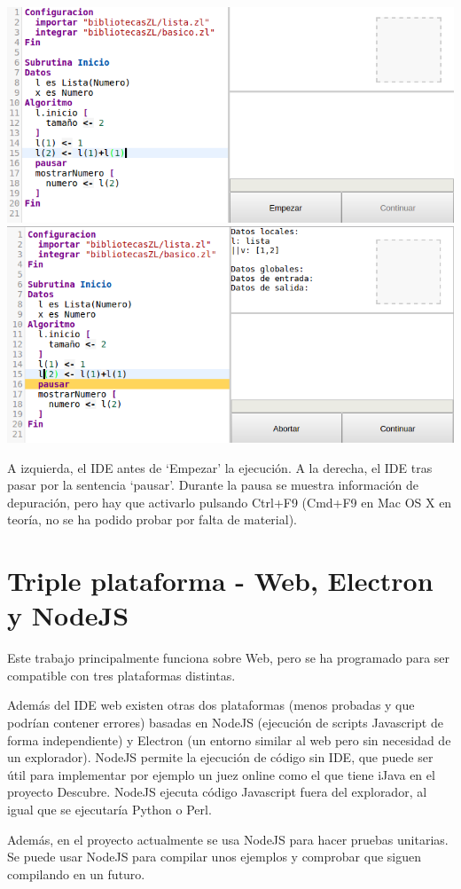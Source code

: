 \documentclass{report}
\begin{document}
	
	\begin{center}
	\includegraphics[width=0.45\linewidth]{pausa1}
	\includegraphics[width=0.45\linewidth]{pausa2}
	
	A izquierda, el IDE antes de `Empezar' la ejecución. A la derecha, el IDE tras pasar por la sentencia `pausar'. Durante la pausa se muestra información de depuración, pero hay que activarlo pulsando Ctrl+F9 (Cmd+F9 en Mac OS X en teoría, no se ha podido probar por falta de material).
	\end{center}
	
	\section{Triple plataforma - Web, Electron y NodeJS}
	
	
	Este trabajo principalmente funciona sobre Web, pero se ha programado para ser compatible con tres plataformas distintas. 
	
	Además del IDE web existen otras dos plataformas (menos probadas y que podrían contener errores) basadas en NodeJS (ejecución de scripts Javascript de forma independiente) y Electron (un entorno similar al web pero sin necesidad de un explorador). NodeJS permite la ejecución de código sin IDE, que puede ser útil para implementar por ejemplo un juez online como el que tiene iJava en el proyecto Descubre. NodeJS ejecuta código Javascript fuera del explorador, al igual que se ejecutaría Python o Perl. 
	
	\vspace{10px}
	
	Además, en el proyecto actualmente se usa NodeJS para hacer pruebas unitarias. Se puede usar NodeJS para compilar unos ejemplos y comprobar que siguen compilando en un futuro. 
	
	\vspace{10px}
	
\end{document}
